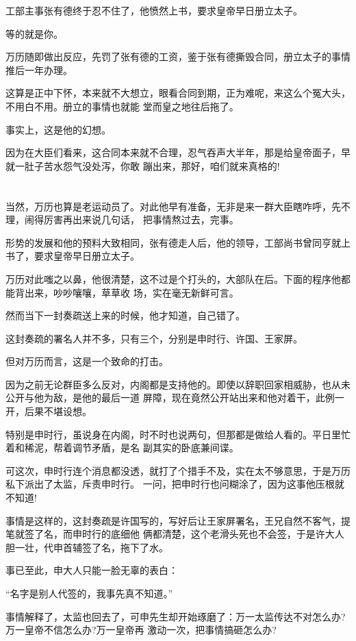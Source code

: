 \documentclass[11pt,a4paper,onecolumn]{article}
\begin{document}
工部主事张有德终于忍不住了，他愤然上书，要求皇帝早日册立太子。

等的就是你。

万历随即做出反应，先罚了张有德的工资，鉴于张有德撕毁合同，册立太子的事情推后一年办理。

这算是正中下怀，本来就不大想立，眼看合同到期，正为难呢，来这么个冤大头，不用白不用。册立的事情也就能
堂而皇之地往后拖了。

事实上，这是他的幻想。

因为在大臣们看来，这合同本来就不合理，忍气吞声大半年，那是给皇帝面子，早就一肚子苦水怨气没处泻，你敢
蹦出来，那好，咱们就来真格的!

\section[\thesection]{}

当然，万历也算是老运动员了。对此他早有准备，无非是来一群大臣瞎咋呼，先不理，闹得厉害再出来说几句话，
把事情熬过去，完事。

形势的发展和他的预料大致相同，张有德走人后，他的领导，工部尚书曾同亨就上书了，要求皇帝早日册立太子。

万历对此嗤之以鼻，他很清楚，这不过是个打头的，大部队在后。下面的程序他都能背出来，吵吵嚷嚷，草草收
场，实在毫无新鲜可言。

然而当下一封奏疏送上来的时候，他才知道，自己错了。

这封奏疏的署名人并不多，只有三个，分别是申时行、许国、王家屏。

但对万历而言，这是一个致命的打击。

因为之前无论群臣多么反对，内阁都是支持他的。即使以辞职回家相威胁，也从未公开与他为敌，是他的最后一道
屏障，现在竟然公开站出来和他对着干，此例一开，后果不堪设想。

特别是申时行，虽说身在内阁，时不时也说两句，但那都是做给人看的。平日里忙着和稀泥，帮着调节矛盾，是名
副其实的卧底兼间谍。

可这次，申时行连个消息都没透，就打了个措手不及，实在太不够意思，于是万历私下派出了太监，斥责申时行。
一问，把申时行也问糊涂了，因为这事他压根就不知道!

事情是这样的，这封奏疏是许国写的，写好后让王家屏署名，王兄自然不客气，提笔就签了名，而申时行的底细他
俩都清楚，这个老滑头死也不会签，于是许大人胆一壮，代申首辅签了名，拖下了水。

事已至此，申大人只能一脸无辜的表白：

``名字是别人代签的，我事先真不知道。''

事情解释了，太监也回去了，可申先生却开始琢磨了：万一太监传达不对怎么办?万一皇帝不信怎么办?万一皇帝再
激动一次，把事情搞砸怎么办?
\end{document}
